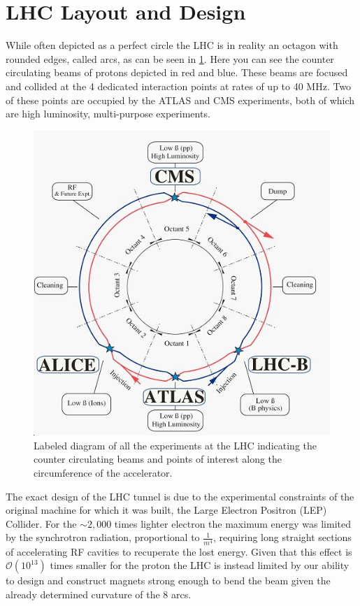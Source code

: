 \section{LHC Layout and Design} \label{sec:lhc:layout}

While often depicted as a perfect circle the LHC is in reality an octagon with
rounded edges, called arcs, as can be seen in \cref{fig:lhc_schematic}.
Here you can see the counter circulating beams of protons depicted in red and
blue.  These beams are focused and collided at the 4 dedicated interaction
points at rates of up to 40 MHz.  Two of these points are occupied by the
ATLAS and CMS experiments, both of which are high luminosity, multi-purpose
experiments.

\begin{figure}[!htbp] 
  \begin{center}
    \includegraphics[width=0.9\linewidth]{figures/lhc/lhc_schematic.jpg}
    \caption{Labeled diagram of all the experiments at the LHC indicating the
counter circulating beams and points of interest along the circumference of the
accelerator.} 
    \label{fig:lhc_schematic} 
  \end{center} 
\end{figure}

The exact design of the LHC tunnel is due to the experimental constraints of the
original machine for which it was built, the Large Electron Positron (LEP)
Collider.  For the $\sim 2,000$ times lighter electron the maximum energy was
limited by the synchrotron radiation, proportional to $\frac{1}{m^4}$, requiring
long straight sections of accelerating RF cavities to recuperate the lost
energy.  Given that this effect is $\mathcal{O}(10^{13})$ times smaller for the
proton the LHC is instead limited by our ability to design and construct magnets
strong enough to bend the beam given the already determined curvature of the 8
arcs.

